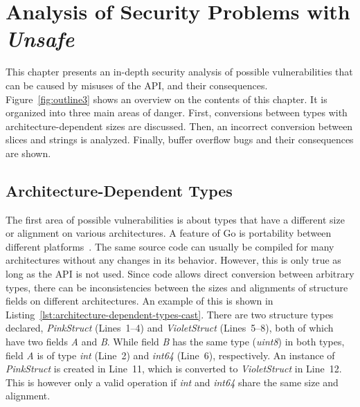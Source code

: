 
\chapter{Analysis of Security Problems with \textit{Unsafe}}\label{ch:unsafe-security-problems}

This chapter presents an in-depth security analysis of possible vulnerabilities that can be caused by misuses of the
\unsafe{} \acrshort{API}, and their consequences.
Figure~\ref{fig:outline3} shows an overview on the contents of this chapter.
It is organized into three main areas of danger.
First, conversions between types with architecture-dependent sizes are discussed.
Then, an incorrect conversion between slices and strings is analyzed.
Finally, buffer overflow bugs and their consequences are shown.





\section{Architecture-Dependent Types}\label{sec:unsafe-security-problems:architecture-dependent-types}

The first area of possible vulnerabilities is about types that have a different size or alignment on various
architectures.
A feature of Go is portability between different platforms~\cite{brimzhanova2019}.
The same source code can usually be compiled for many architectures without any changes in its behavior.
However, this is only true as long as the \unsafe{} \acrshort{API} is not used.
Since \unsafe{} code allows direct conversion between arbitrary types, there can be inconsistencies between the sizes
and alignments of structure fields on different architectures.
An example of this is shown in Listing~\ref{lst:architecture-dependent-types-cast}.
There are two structure types declared, \textit{PinkStruct} (Lines~1--4) and \textit{VioletStruct} (Lines~5--8), both of
which have two fields \textit{A} and \textit{B}.
While field \textit{B} has the same type (\textit{uint8}) in both types, field \textit{A} is of type \textit{int}
(Line~2) and \textit{int64} (Line~6), respectively.
An instance of \textit{PinkStruct} is created in Line~11, which is converted to \textit{VioletStruct} in Line~12.
This is however only a valid operation if \textit{int} and \textit{int64} share the same size and alignment.

